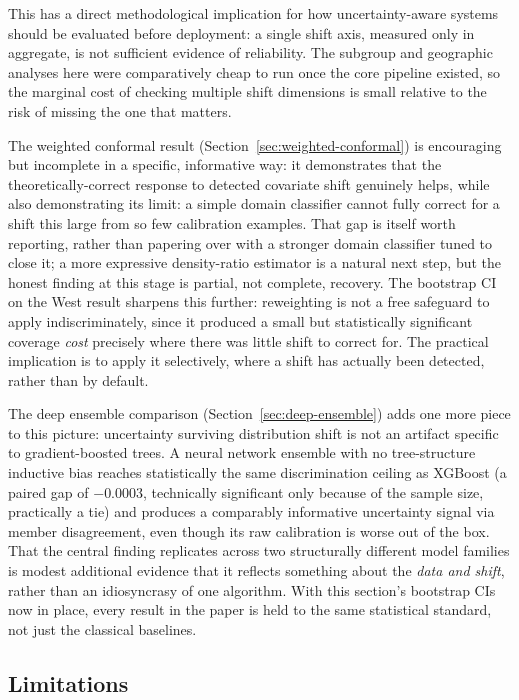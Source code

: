 \documentclass[12pt]{article}
\begin{document}
This has a direct methodological implication for how uncertainty-aware systems should be evaluated before deployment: a single shift axis, measured only in aggregate, is not sufficient evidence of reliability. The subgroup and geographic analyses here were comparatively cheap to run once the core pipeline existed, so the marginal cost of checking multiple shift dimensions is small relative to the risk of missing the one that matters.

The weighted conformal result (Section~\ref{sec:weighted-conformal}) is encouraging but incomplete in a specific, informative way: it demonstrates that the theoretically-correct response to detected covariate shift genuinely helps, while also demonstrating its limit: a simple domain classifier cannot fully correct for a shift this large from so few calibration examples. That gap is itself worth reporting, rather than papering over with a stronger domain classifier tuned to close it; a more expressive density-ratio estimator is a natural next step, but the honest finding at this stage is partial, not complete, recovery. The bootstrap CI on the West result sharpens this further: reweighting is not a free safeguard to apply indiscriminately, since it produced a small but statistically significant coverage \emph{cost} precisely where there was little shift to correct for. The practical implication is to apply it selectively, where a shift has actually been detected, rather than by default.

The deep ensemble comparison (Section~\ref{sec:deep-ensemble}) adds one more piece to this picture: uncertainty surviving distribution shift is not an artifact specific to gradient-boosted trees. A neural network ensemble with no tree-structure inductive bias reaches statistically the same discrimination ceiling as XGBoost (a paired gap of $-0.0003$, technically significant only because of the sample size, practically a tie) and produces a comparably informative uncertainty signal via member disagreement, even though its raw calibration is worse out of the box. That the central finding replicates across two structurally different model families is modest additional evidence that it reflects something about the \emph{data and shift}, rather than an idiosyncrasy of one algorithm. With this section's bootstrap CIs now in place, every result in the paper is held to the same statistical standard, not just the classical baselines.

\subsection{Limitations}
\end{document}
